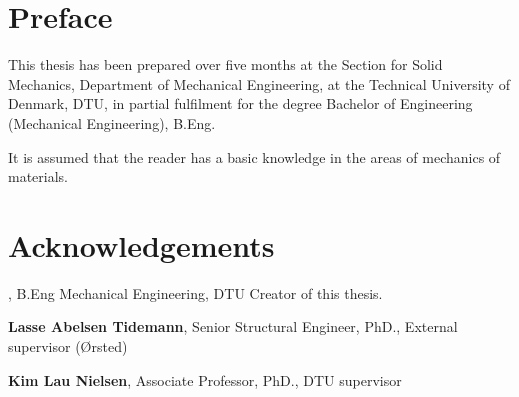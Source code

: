 \section*{Preface}
This thesis has been prepared over five months at the Section for Solid Mechanics, Department of Mechanical Engineering, at the Technical University of Denmark, DTU, in partial fulfilment for the degree Bachelor of Engineering (Mechanical Engineering), B.Eng. 

It is assumed that the reader has a basic knowledge in the areas of mechanics of materials. 

\section*{Acknowledgements}
\textbf{\thesisauthor}, B.Eng Mechanical Engineering, DTU \newline
Creator of this thesis.

\textbf{Lasse Abelsen Tidemann}, Senior Structural Engineer, PhD., External supervisor (Ørsted) \newline

\textbf{Kim Lau Nielsen}, Associate Professor, PhD., DTU supervisor \newline


\vfill

\begin{center}
\namesigdate{\thesisauthor~-~\studentnumber}
\end{center}

\vfill
